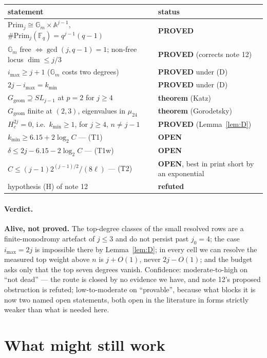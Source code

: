 \documentclass[10pt]{article}
\theoremstyle{plain}
\theoremstyle{definition}
\newcommand{\F}{\mathbb F}
\newcommand{\Prim}{\mathrm{Prim}}
\newcommand{\Ggeom}{G_{\mathrm{geom}}}
\newcommand{\imax}{i_{\max}}
\newcommand{\kmin}{k_{\min}}
\newcommand{\proved}{\textcolor{proved}{\textsf{\textbf{\footnotesize PROVED}}}}
\newcommand{\openstatus}{\textcolor{open}{\textsf{\textbf{\footnotesize OPEN}}}}
\begin{document}
\begin{center}\small
\begin{tabular}{ll}
\hline
statement & status\\
\hline
$\Prim_j\cong\mathbb G_m\times\mathbb A^{j-1}$, $\#\Prim_j(\F_q)=q^{j-1}(q-1)$ & \proved\\
$\mathbb G_m$ free $\iff\gcd(j,q-1)=1$; non-free locus $\dim\le j/3$ & \proved{} (corrects note 12)\\
$\imax\ge j+1$ ($\mathbb G_m$ costs two degrees) & \proved{} under (D)\\
$2j-\imax=\kmin$ & \proved{} under (D)\\
$\Ggeom\supseteq SL_{j-1}$ at $p=2$ for $j\ge4$ & \textbf{theorem} (Katz)\\
$\Ggeom$ finite at $(2,3)$, eigenvalues in $\mu_{24}$ & \textbf{theorem} (Gorodetsky)\\
$H^{2j}_c=0$, i.e.\ $\kmin\ge1$, for $j\ge4$, $n\ne j-1$ & \proved{} (Lemma~\ref{lem:D})\\
$\kmin\ge6.15+2\log_2C$ --- (T1) & \openstatus\\
$\delta\le2j-6.15-2\log_2C$ --- (T1w) & \openstatus\\
$C\le(j-1)2^{(j-1)/2}/(8\ell)$ --- (T2) & \openstatus, best in print short by an exponential\\
hypothesis (H) of note 12 & \textbf{refuted}\\
\hline
\end{tabular}
\end{center}

\paragraph{Verdict.} \textbf{Alive, not proved.} The top-degree classes of the
small resolved rows are a finite-monodromy artefact of $j\le3$ and do not
persist past $j_0=4$; the case $\imax=2j$ is impossible there by
Lemma~\ref{lem:D}; in every cell we can resolve the measured top weight above
$n$ is $j+O(1)$, never $2j-O(1)$; and the budget asks only that the top seven
degrees vanish. Confidence: moderate-to-high on ``not dead'' --- the route is
closed by no evidence we have, and note 12's proposed obstruction is refuted;
low-to-moderate on ``provable'', because what blocks it is now two named open
statements, both open in the literature in forms strictly weaker than what is
needed here.
\section{What might still work}\label{sec:whatmight}
\end{document}
